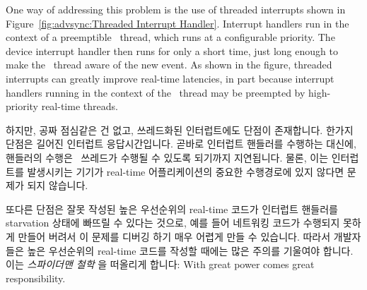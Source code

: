 One way of addressing this problem is the use of threaded interrupts shown in
Figure~\ref{fig:advsync:Threaded Interrupt Handler}.
Interrupt handlers run in the context of a preemptible \IRQ\ thread,
which runs at a configurable priority.
The device interrupt handler then runs for only a short time, just
long enough to make the \IRQ\ thread aware of the new event.
As shown in the figure, threaded interrupts can greatly improve
real-time latencies, in part because interrupt handlers running in
the context of the \IRQ\ thread may be preempted by high-priority real-time
threads.
\fi

하지만, 공짜 점심같은 건 없고, 쓰레드화된 인터럽트에도 단점이 존재합니다.
한가지 단점은 길어진 인터럽트 응답시간입니다.
곧바로 인터럽트 핸들러를 수행하는 대신에, 핸들러의 수행은 \IRQ\ 쓰레드가 수행될
수 있도록 되기까지 지연됩니다.
물론, 이는 인터럽트를 발생시키는 기기가 real-time 어플리케이션의 중요한
수행경로에 있지 않다면 문제가 되지 않습니다.

또다른 단점은 잘못 작성된 높은 우선순위의 real-time 코드가 인터럽트 핸들러를
starvation 상태에 빠뜨릴 수 있다는 것으로, 예를 들어 네트워킹 코드가 수행되지
못하게 만들어 버려서 이 문제를 디버깅 하기 매우 어렵게 만들 수 있습니다.
따라서 개발자들은 높은 우선순위의 real-time 코드를 작성할 때에는 많은 주의를
기울여야 합니다.
이는 \emph{스파이더맨 철학} 을 떠올리게 합니다: With great power comes great
responsibility.


